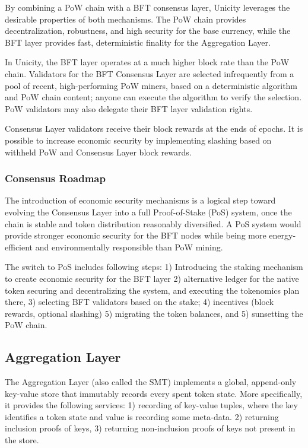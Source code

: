 \documentclass[twocolumn]{article}
\begin{document}
By combining a PoW chain with a BFT consensus layer, Unicity leverages the desirable properties of both mechanisms. The PoW chain provides decentralization, robustness, and high security for the base currency, while the BFT layer provides fast, deterministic finality for the Aggregation Layer.

In Unicity, the BFT layer operates at a much higher block rate than the PoW chain. Validators for the BFT Consensus Layer are selected infrequently from a pool of recent, high-performing PoW miners, based on a deterministic algorithm and PoW chain content; anyone can execute the algorithm to verify the selection. PoW validators may also delegate their BFT layer validation rights.

Consensus Layer validators receive their block rewards at the ends of epochs. It is possible to increase economic security by implementing slashing based on withheld PoW and Consensus Layer block rewards.

\subsubsection{Consensus Roadmap}

The introduction of economic security mechanisms is a logical step toward evolving the Consensus Layer into a full Proof-of-Stake (PoS) system, once the chain is stable and token distribution reasonably diversified. A PoS system would provide stronger economic security for the BFT nodes while being more energy-efficient and environmentally responsible than PoW mining.

The switch to PoS includes following steps: 1) Introducing the staking mechanism to create economic security for the BFT layer 2) alternative ledger for the native token securing and decentralizing the system, and executing the tokenomics plan there, 3) selecting BFT validators based on the stake; 4) incentives (block rewards, optional slashing) 5) migrating the token balances, and 5) sunsetting the PoW chain.

\subsection{Aggregation Layer}

The Aggregation Layer (also called the SMT) implements a global, append-only key-value store that immutably records every spent token state. More specifically, it provides the following services: 1) recording of key-value tuples, where the key identifies a token state and value is recording some meta-data. 2) returning inclusion proofs of keys, 3) returning non-inclusion proofs of keys not present in the store.
\end{document}
